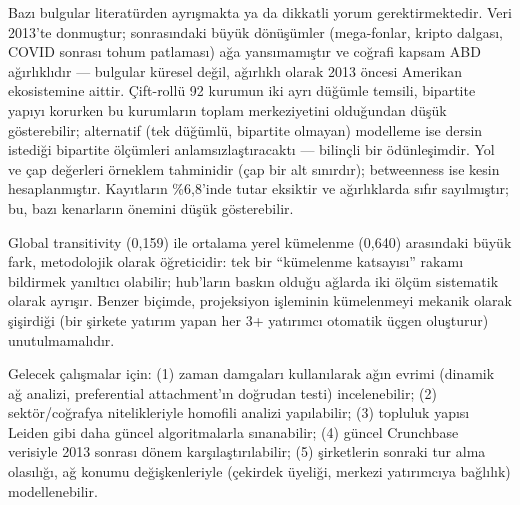 \documentclass[12pt,a4paper]{article}
\begin{document}
Bazı bulgular literatürden ayrışmakta ya da dikkatli yorum gerektirmektedir. Veri 2013'te donmuştur; sonrasındaki büyük dönüşümler (mega-fonlar, kripto dalgası, COVID sonrası tohum patlaması) ağa yansımamıştır ve coğrafi kapsam ABD ağırlıklıdır --- bulgular küresel değil, ağırlıklı olarak 2013 öncesi Amerikan ekosistemine aittir. Çift-rollü 92 kurumun iki ayrı düğümle temsili, bipartite yapıyı korurken bu kurumların toplam merkeziyetini olduğundan düşük gösterebilir; alternatif (tek düğümlü, bipartite olmayan) modelleme ise dersin istediği bipartite ölçümleri anlamsızlaştıracaktı --- bilinçli bir ödünleşimdir. Yol ve çap değerleri örneklem tahminidir (çap bir alt sınırdır); betweenness ise kesin hesaplanmıştır. Kayıtların \%6,8'inde tutar eksiktir ve ağırlıklarda sıfır sayılmıştır; bu, bazı kenarların önemini düşük gösterebilir.

Global transitivity (0,159) ile ortalama yerel kümelenme (0,640) arasındaki büyük fark, metodolojik olarak öğreticidir: tek bir ``kümelenme katsayısı'' rakamı bildirmek yanıltıcı olabilir; hub'ların baskın olduğu ağlarda iki ölçüm sistematik olarak ayrışır. Benzer biçimde, projeksiyon işleminin kümelenmeyi mekanik olarak şişirdiği (bir şirkete yatırım yapan her 3+ yatırımcı otomatik üçgen oluşturur) unutulmamalıdır.

Gelecek çalışmalar için: (1) zaman damgaları kullanılarak ağın evrimi (dinamik ağ analizi, preferential attachment'ın doğrudan testi) incelenebilir; (2) sektör/coğrafya nitelikleriyle homofili analizi yapılabilir; (3) topluluk yapısı Leiden gibi daha güncel algoritmalarla sınanabilir; (4) güncel Crunchbase verisiyle 2013 sonrası dönem karşılaştırılabilir; (5) şirketlerin sonraki tur alma olasılığı, ağ konumu değişkenleriyle (çekirdek üyeliği, merkezi yatırımcıya bağlılık) modellenebilir.
\end{document}
